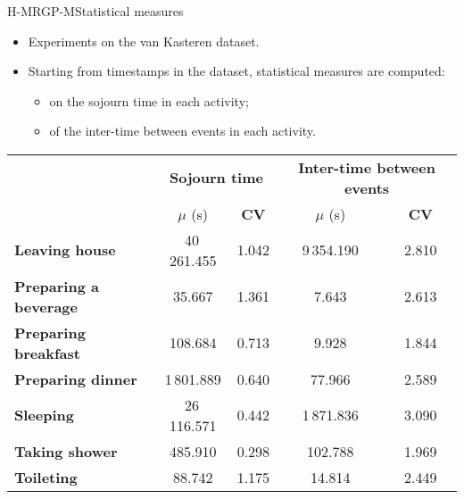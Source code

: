 \documentclass[9pt, handout]{beamer}
\begin{document}
      \begin{frame}{H-MRGP-M}{Statistical measures}
        \pause
        \begin{itemize}
          \item Experiments on the van Kasteren dataset.
          \pause
          \item Starting from timestamps in the dataset, statistical measures are computed:
          \begin{itemize}
            \item on the sojourn time in each activity;
            \item of the inter-time between events in each activity.
          \end{itemize}
        \end{itemize}
        
        \pause
    		\begin{table}[h!]
    			\centering
    			\small
    			\setlength{\tabcolsep}{5pt}
    			\def\arraystretch{0.75}
    			\begin{tabular}{| l | c | c || c | c |}
    				\hline
    				& \multicolumn{2}{|c||}{\bf Sojourn time}& \multicolumn{2}{|c|}{\bf Inter-time between events}\\
    				\cline{2-5}
    				& $\mu$ (s) & {\bf CV} & $\mu$ (s) & {\bf CV}\\
    				\hline
    				{\bf Leaving house} & 40\,261.455 & 1.042 & 9\,354.190 & 2.810 \\ \hline
    				{\bf Preparing a beverage} &  35.667 & 1.361 & 7.643 & 2.613\\ \hline
    				{\bf Preparing breakfast} &  108.684 & 0.713 & 9.928 & 1.844\\ \hline
    				{\bf Preparing dinner} &  1\,801.889 & 0.640 & 77.966 & 2.589\\ \hline
    				{\bf Sleeping} &  26\,116.571 & 0.442 & 1\,871.836 & 3.090\\ \hline
    				{\bf Taking shower} &  485.910 & 0.298 & 102.788 & 1.969\\ \hline
    				{\bf Toileting} &  88.742 & 1.175 & 14.814 & 2.449\\ 
    				\hline
      		\end{tabular}
    		\end{table}
      \end{frame}
      
\end{document}
